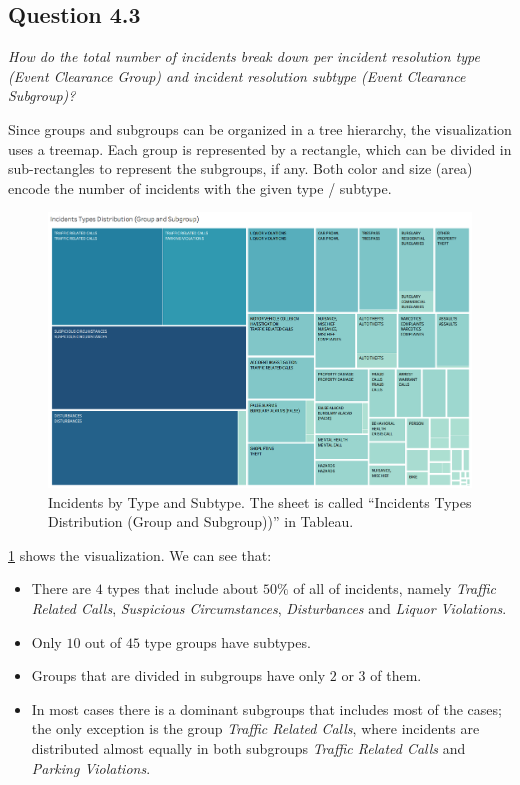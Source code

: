 
\subsection*{Question 4.3}
\textit{How do the total number of incidents break down per incident resolution type (Event Clearance Group) and incident resolution subtype (Event Clearance Subgroup)?}

Since groups and subgroups can be organized in a tree hierarchy, the visualization uses a treemap.
Each group is represented by a rectangle, which can be divided in sub-rectangles to represent the subgroups, if any.
Both color and size (area) encode the number of incidents with the given type / subtype.

\begin{figure}[h]
	\centering
	\includegraphics[width=\columnwidth]{figures/4_3_groups_subgroups}
	\caption{Incidents by Type and Subtype. The sheet is called ``Incidents Types Distribution (Group and Subgroup))'' in Tableau.}
	\label{fig:4_3_groups_subgroups}
\end{figure}

\cref{fig:4_3_groups_subgroups} shows the visualization.
We can see that:
\begin{itemize}
	\item There are $4$ types that include about $50\%$ of all of incidents, namely \textit{Traffic Related Calls}, \textit{Suspicious Circumstances}, \textit{Disturbances} and \textit{Liquor Violations}.
	\item Only $10$ out of $45$ type groups have subtypes.
	\item Groups that are divided in subgroups have only $2$ or $3$ of them.
	\item In most cases there is a dominant subgroups that includes most of the cases; the only exception is the group \textit{Traffic Related Calls}, where incidents are distributed almost equally in both subgroups \textit{Traffic Related Calls} and \textit{Parking Violations}.
\end{itemize}

